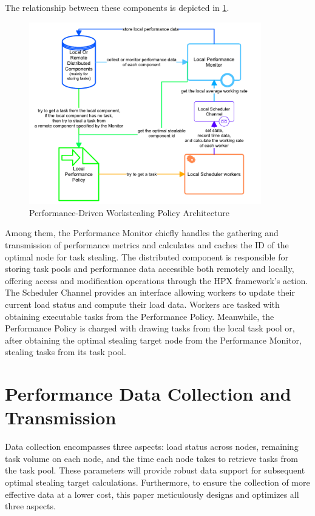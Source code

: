\documentclass{mproj}
\begin{document}
The relationship between these components is depicted in \cref{fig:overall_architecture}.
\begin{figure}[h]
    \centering
    \includegraphics[width=0.9\textwidth]{images/overall_architecture.pdf}
    \caption{Performance-Driven Workstealing Policy Architecture}
    \label{fig:overall_architecture}
\end{figure}
\FloatBarrier

Among them, the Performance Monitor chiefly handles the gathering and transmission of performance metrics
and calculates and caches the ID of the optimal node for task stealing.
The distributed component is responsible for storing task pools and performance data
accessible both remotely and locally, offering access and modification operations through the HPX framework's action.
The Scheduler Channel provides an interface allowing workers to update their current load status
and compute their load data. Workers are tasked with obtaining executable tasks from the Performance Policy.
Meanwhile, the Performance Policy is charged with drawing tasks from the local task pool
or, after obtaining the optimal stealing target node from the Performance Monitor, stealing tasks from its task pool.


\section{Performance Data Collection and Transmission}
Data collection encompasses three aspects: load status across nodes,
remaining task volume on each node,
and the time each node takes to retrieve tasks from the task pool.
These parameters will provide robust data support for subsequent optimal stealing target calculations.
Furthermore, to ensure the collection of more effective data at a lower cost,
this paper meticulously designs and optimizes all three aspects.
\end{document}
